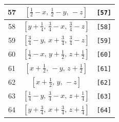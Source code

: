 \documentclass[fleqn,8pt]{jsarticle}
\begin{document}
\begin{longtable}{ccc}
57 & $\left[ \frac{1}{2} - x,\, \frac{1}{2} - y,\, - z \right]$ & {\tt [57]} \\ \hline
58 & $\left[ y + \frac{1}{4},\, \frac{3}{4} - x,\, \frac{3}{4} - z \right]$ & {\tt [58]} \\ \hline
59 & $\left[ \frac{3}{4} - y,\, x + \frac{3}{4},\, \frac{3}{4} - z \right]$ & {\tt [59]} \\ \hline
60 & $\left[ \frac{1}{2} - x,\, y + \frac{1}{2},\, z + \frac{1}{2} \right]$ & {\tt [60]} \\ \hline
61 & $\left[ x + \frac{1}{2},\, - y,\, z + \frac{1}{2} \right]$ & {\tt [61]} \\ \hline
62 & $\left[ x + \frac{1}{2},\, y,\, - z \right]$ & {\tt [62]} \\ \hline
63 & $\left[ \frac{1}{4} - y,\, \frac{3}{4} - x,\, z + \frac{1}{4} \right]$ & {\tt [63]} \\ \hline
64 & $\left[ y + \frac{3}{4},\, x + \frac{3}{4},\, z + \frac{1}{4} \right]$ & {\tt [64]} \\
\end{longtable}
\end{document}
